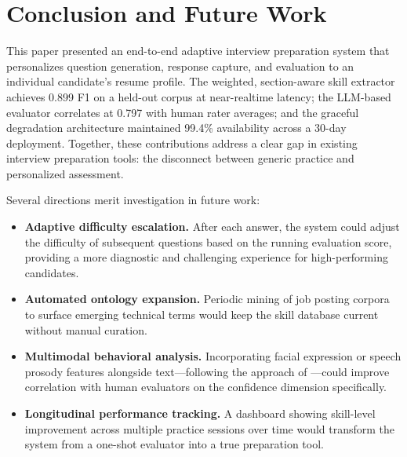 \documentclass[conference]{IEEEtran}
\begin{document}
\section{Conclusion and Future Work}
\label{sec:conclusion}

This paper presented an end-to-end adaptive interview preparation system that personalizes question generation, response capture, and evaluation to an individual candidate's resume profile. The weighted, section-aware skill extractor achieves 0.899 F1 on a held-out corpus at near-realtime latency; the LLM-based evaluator correlates at 0.797 with human rater averages; and the graceful degradation architecture maintained 99.4\% availability across a 30-day deployment. Together, these contributions address a clear gap in existing interview preparation tools: the disconnect between generic practice and personalized assessment.

Several directions merit investigation in future work:

\begin{itemize}
    \item \textbf{Adaptive difficulty escalation.} After each answer, the system could adjust the difficulty of subsequent questions based on the running evaluation score, providing a more diagnostic and challenging experience for high-performing candidates.
    \item \textbf{Automated ontology expansion.} Periodic mining of job posting corpora to surface emerging technical terms would keep the skill database current without manual curation.
    \item \textbf{Multimodal behavioral analysis.} Incorporating facial expression or speech prosody features alongside text—following the approach of \cite{naous2022automated}—could improve correlation with human evaluators on the confidence dimension specifically.
    \item \textbf{Longitudinal performance tracking.} A dashboard showing skill-level improvement across multiple practice sessions over time would transform the system from a one-shot evaluator into a true preparation tool.
\end{itemize}
\end{document}
